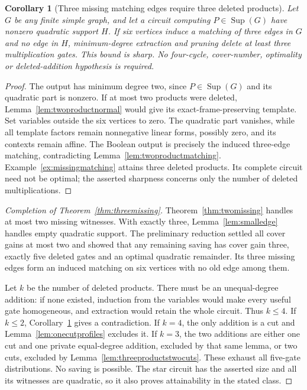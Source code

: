\documentclass[11pt]{article}
\newcommand{\Sup}{\operatorname{Sup}}
\newtheorem{corollary}[theorem]{Corollary}
\theoremstyle{definition}
\theoremstyle{remark}
\begin{document}
\begin{corollary}[Three missing matching edges require three deleted products]\label{cor:threedeletedproducts}
Let $G$ be any finite simple graph, and let a circuit computing $P\in\Sup(G)$ have nonzero quadratic support $H$. If six vertices induce a matching of three edges in $G$ and no edge in $H$, minimum-degree extraction and pruning delete at least three multiplication gates. This bound is sharp. No four-cycle, cover-number, optimality or deleted-addition hypothesis is required.
\end{corollary}
\begin{proof}
The output has minimum degree two, since $P\in\Sup(G)$ and its quadratic part is nonzero. If at most two products were deleted, Lemma~\ref{lem:twoproductnormal} would give its exact-frame-preserving template. Set variables outside the six vertices to zero. The quadratic part vanishes, while all template factors remain nonnegative linear forms, possibly zero, and its contexts remain affine. The Boolean output is precisely the induced three-edge matching, contradicting Lemma~\ref{lem:twoproductmatching}. Example~\ref{ex:missingmatching} attains three deleted products. Its complete circuit need not be optimal; the asserted sharpness concerns only the number of deleted multiplications.
\end{proof}

\begin{proof}[Completion of Theorem~\ref{thm:threemissing}]
Theorem~\ref{thm:twomissing} handles at most two missing witnesses. With exactly three, Lemma~\ref{lem:smalledge} handles empty quadratic support. The preliminary reduction settled all cover gains at most two and showed that any remaining saving has cover gain three, exactly five deleted gates and an optimal quadratic remainder. Its three missing edges form an induced matching on six vertices with no old edge among them.

Let $k$ be the number of deleted products. There must be an unequal-degree addition: if none existed, induction from the variables would make every useful gate homogeneous, and extraction would retain the whole circuit. Thus $k\le4$. If $k\le2$, Corollary~\ref{cor:threedeletedproducts} gives a contradiction. If $k=4$, the only addition is a cut and Lemma~\ref{lem:onecutprofiles} excludes it. If $k=3$, the two additions are either one cut and one private equal-degree addition, excluded by that same lemma, or two cuts, excluded by Lemma~\ref{lem:threeproductstwocuts}. These exhaust all five-gate distributions. No saving is possible. The star circuit has the asserted size and all its witnesses are quadratic, so it also proves attainability in the stated class.
\end{proof}
\end{document}

